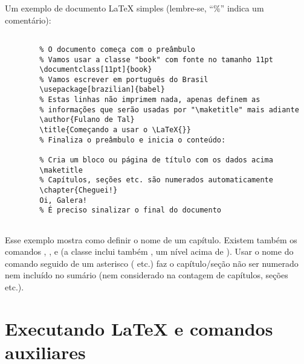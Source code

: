 Um exemplo de documento \LaTeX{} simples (lembre-se, ``\%'' indica um
comentário):

\begin{verbatim}

        % O documento começa com o preâmbulo
        % Vamos usar a classe "book" com fonte no tamanho 11pt
        \documentclass[11pt]{book}
        % Vamos escrever em português do Brasil
        \usepackage[brazilian]{babel}
        % Estas linhas não imprimem nada, apenas definem as
        % informações que serão usadas por "\maketitle" mais adiante
        \author{Fulano de Tal}
        \title{Começando a usar o \LaTeX{}}
        % Finaliza o preâmbulo e inicia o conteúdo:
        
        % Cria um bloco ou página de título com os dados acima
        \maketitle
        % Capítulos, seções etc. são numerados automaticamente
        \chapter{Cheguei!}
        Oi, Galera!
        % É preciso sinalizar o final do documento
        

\end{verbatim}

Esse exemplo mostra como definir o nome de um capítulo. Existem também os
comandos , ,  e
 (a classe  inclui também , um nível
acima de ). Usar o nome do comando seguido de um asterisco
( etc.) faz o capítulo/seção não ser numerado nem incluído
no sumário (nem considerado na contagem de capítulos, seções etc.).

\section{Executando \LaTeX{} e comandos auxiliares}
\label{sec:make}

\enlargethispage{.5\baselineskip}


